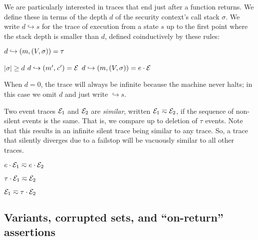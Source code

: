 \documentclass[10pt,conference]{ieeetran}%
\theoremstyle{definition}
\begin{document}
We are particularly interested in traces that end just after a function returns.
We define these in terms of the depth \(d\) of the security context's call stack \(\sigma\).
We write \(d \hookrightarrow s\) for the trace of execution from a state \(s\)
up to the first point where the stack depth is smaller than \(d\), defined
coinductively by these rules:

         {\(d \hookrightarrow (m,(V,\sigma)) = \tau\)}

              {\(|\sigma| \geq d\)}
              {\(d \hookrightarrow (m',\mathit{c}') = \mathcal{E}\)}
              {\(d \hookrightarrow (m,(V,\sigma)) = e \cdot \mathcal{E}\)}

\noindent
When \(d = 0\), the trace will always be infinite because the machine never halts; in this case we
omit \(d\) and just write \(\hookrightarrow s\).

Two event traces $\mathcal{E}_1$ and $\mathcal{E}_2$ are {\em similar},
written \(\mathcal{E}_1 \eqsim \mathcal{E}_2\), if the sequence of non-silent events
is the same. That is, we compare up to deletion of \(\tau\) events.
Note that this results in an infinite silent trace being similar to
any trace. So, a trace that silently diverges due to a failstop will
be vacuously similar to all other traces.

\begin{minipage}{.4\columnwidth}
  \judgment{}{\(\obsT \eqsim \obsT\)}
\end{minipage}
\begin{minipage}{.4\columnwidth}
           {\(e \cdot \mathcal{E}_1 \eqsim e \cdot \mathcal{E}_2\)}
\end{minipage}

\begin{minipage}{.4\columnwidth}
           {\(\tau \cdot \mathcal{E}_1 \eqsim \mathcal{E}_2\)}
\end{minipage}
\begin{minipage}{.4\columnwidth}
           {\(\mathcal{E}_1 \eqsim \tau \cdot \mathcal{E}_2\)}
\end{minipage}

\subsection{Variants, corrupted sets, and ``on-return'' assertions}
\label{sec:props}
\end{document}
